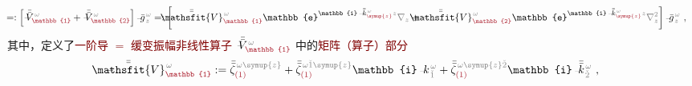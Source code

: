 \begin{subequations}
\begin{align}
	\!\!\! &=: \left[ \Xint{\mathcolor{gray}{-}}{25}{\bar{\bar{V}}}^{\;\! \mathcolor{gray}{\omega}}_{\textcolor{Maroon}{\mathbb{1}}} + \Xint{\mathcolor{gray}{-}}{25}{\bar{\bar{V}}}^{\;\! \mathcolor{gray}{\omega}}_{\textcolor{Maroon}{\mathbb{2}}} \right] \Xint{{}^{}_{\mathcolor{gray}{-}}}{10}{\bar{g}}^{\;\!\mathcolor{gray}{\omega}}_{\;\! \mathcolor{gray}{z}} =: \left[ \Xint{\mathcolor{gray}{-}}{25}{\bar{\bar{\mathsfit{V}}}}^{\;\! \mathcolor{gray}{\omega}}_{\textcolor{Maroon}{\mathbb{1}}} \mathbb{e}^{\mathbb{i} \Xint{\begin{smallmatrix} ~ \\ {}^{}_{\mathcolor{gray}{-}} \\ ~ \end{smallmatrix}}{15}{\bar{\bar{k}}}_{\textcolor{Maroon}{\symup{z}}}^{\;\! \mathcolor{gray}{\omega}} \mathcolor{gray}{z}} \mathcolor{gray}{\nabla_z} + \Xint{\mathcolor{gray}{-}}{25}{\bar{\bar{\mathsfit{V}}}}^{\;\! \mathcolor{gray}{\omega}}_{\textcolor{Maroon}{\mathbb{2}}} \mathbb{e}^{\mathbb{i} \Xint{\begin{smallmatrix} ~ \\ {}^{}_{\mathcolor{gray}{-}} \\ ~ \end{smallmatrix}}{15}{\bar{\bar{k}}}_{\textcolor{Maroon}{\symup{z}}}^{\;\! \mathcolor{gray}{\omega}} \mathcolor{gray}{z}} \mathcolor{gray}{\nabla_z^2} \right] \Xint{{}^{}_{\mathcolor{gray}{-}}}{10}{\bar{g}}^{\;\!\mathcolor{gray}{\omega}}_{\;\! \mathcolor{gray}{z}} ~, \label{eq:matrix_exp_eq-left_V-1st2nd-decompose}
\end{align}
\end{subequations}
其中，定义了\textcolor{Maroon}{一阶导 $=$ 缓变振幅非线性算子} $\Xint{\mathcolor{gray}{-}}{21}{\bar{\bar{V}}}^{\;\! \mathcolor{gray}{\omega}}_{\textcolor{Maroon}{\mathbb{1}}}$ 中的\textcolor{Maroon}{矩阵（算子）部分}
\begin{align} \label{eq:matrix_exp-V1}
	\Xint{\mathcolor{gray}{-}}{25}{\bar{\bar{\mathsfit{V}}}}^{\;\! \mathcolor{gray}{\omega}}_{\textcolor{Maroon}{\mathbb{1}}} := \bar{\bar{\zeta}}^{\;\! \mathcolor{gray}{\omega} \mathcolor{gray}{\symup{z}}}_{\textcolor{Maroon}{(1)}} + \bar{\bar{\zeta}}^{\;\! \mathcolor{gray}{\omega} \mathcolor{gray}{\check{1} \symup{z}}}_{\textcolor{Maroon}{(1)}} \mathbb{i} \Xint{\begin{smallmatrix} ~ \\ {}^{}_{\mathcolor{gray}{-}} \\ ~ \end{smallmatrix}}{15}{k}_{\;\! \mathcolor{gray}{\check{1}}}^{\;\! \mathcolor{gray}{\omega}} + \bar{\bar{\zeta}}^{\;\! \mathcolor{gray}{\omega} \mathcolor{gray}{\symup{z} \check{2}}}_{\textcolor{Maroon}{(1)}} \mathbb{i} \Xint{\begin{smallmatrix} ~ \\ {}^{}_{\mathcolor{gray}{-}} \\ ~ \end{smallmatrix}}{15}{\bar{\bar{k}}}_{\;\! \mathcolor{gray}{\check{2}}}^{\;\! \mathcolor{gray}{\omega}} ~, 
\end{align}
